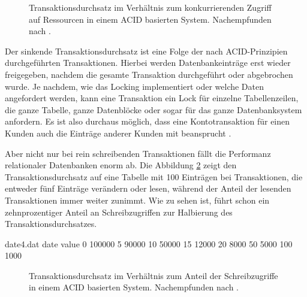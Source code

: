 \documentclass[12pt,oneside,a4paper,parskip]{scrbook}
\begin{document}
\begin{figure}
\begin{center}
\caption[Transaktionsdurchsatz im Verhältnis zum konkurrierenden Zugriff]{Transaktionsdurchsatz im Verhältnis zum konkurrierenden Zugriff auf Ressourcen in einem ACID basierten System. Nachempfunden nach \cite{salt}.}
\label{salt}
\end{center}
\end{figure}
Der sinkende Transaktionsdurchsatz ist eine Folge der nach ACID-Prinzipien durchgeführten Transaktionen. Hierbei werden Datenbankeinträge erst wieder freigegeben, nachdem die gesamte Transaktion durchgeführt oder abgebrochen wurde. Je nachdem, wie das Locking implementiert oder welche Daten angefordert werden, kann eine Transaktion ein Lock für einzelne Tabellenzeilen, die ganze Tabelle, ganze Datenblöcke oder sogar für das ganze Datenbanksystem anfordern. Es ist also durchaus möglich, dass eine Kontotransaktion für einen Kunden auch die Einträge anderer Kunden mit beansprucht \cite{locking}\cite{dbarchitecture}.

Aber nicht nur bei rein schreibenden Transaktionen fällt die Performanz relationaler Datenbanken enorm ab. Die Abbildung \ref{salt2} zeigt den Transaktionsdurchsatz auf eine Tabelle mit 100 Einträgen bei Transaktionen, die entweder fünf Einträge verändern oder lesen, während der Anteil der lesenden Transaktionen immer weiter zunimmt. Wie zu sehen ist, führt schon ein zehnprozentiger Anteil an Schreibzugriffen zur Halbierung des Transaktionsdurchsatzes.
\begin{filecontents}{date4.dat}
date  value
0     100000
5     90000
10    50000
15    12000
20     8000
50     5000
100    1000
\end{filecontents}


\begin{figure}
\begin{center}
\caption[Transaktionsdurchsatz im Verhältnis zum Anteil der Schreibzugriffe]{Transaktionsdurchsatz im Verhältnis zum Anteil der Schreibzugriffe in einem ACID basierten System. Nachempfunden nach \cite{salt}.}
\label{salt2}
\end{center}
\end{figure}
\end{document}
